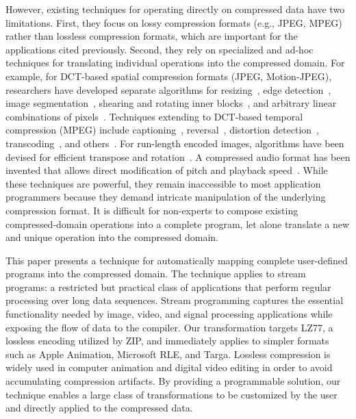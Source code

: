 However, existing techniques for operating directly on compressed data
have two limitations.  First, they focus on lossy compression formats
(e.g., JPEG, MPEG) rather than lossless compression formats, which are
important for the applications cited previously.  Second, they rely on
specialized and ad-hoc techniques for translating individual
operations into the compressed domain.  For example, for DCT-based
spatial compression formats (JPEG, Motion-JPEG), researchers have
developed separate algorithms for resizing~\cite{dugad01,mukherjee02},
edge detection~\cite{shen96b,shen96}, image
segmentation~\cite{feng03}, shearing and rotating inner
blocks~\cite{shen98}, and arbitrary linear combinations of
pixels~\cite{smith96b}.  Techniques extending to DCT-based temporal
compression (MPEG) include captioning~\cite{nang00},
reversal~\cite{vasudev98}, distortion detection~\cite{dorai00},
transcoding~\cite{smith98}, and others~\cite{wee02survey}.  For
run-length encoded images, algorithms have been devised for efficient
transpose and rotation~\cite{misra99,shoji95}.  A compressed audio
format has been invented that allows direct modification of pitch and
playback speed~\cite{levine98}.  While these techniques are powerful,
they remain inaccessible to most application programmers because they
demand intricate manipulation of the underlying compression format.
It is difficult for non-experts to compose existing compressed-domain
operations into a complete program, let alone translate a new and
unique operation into the compressed domain.

This paper presents a technique for automatically mapping complete
user-defined programs into the compressed domain.  The technique
applies to stream programs: a restricted but practical class of
applications that perform regular processing over long data sequences.
Stream programming captures the essential functionality needed by
image, video, and signal processing applications while exposing the
flow of data to the compiler.  Our transformation targets LZ77, a
lossless encoding utilized by ZIP, and immediately applies to simpler
formats such as Apple Animation, Microsoft RLE, and Targa.  Lossless
compression is widely used in computer animation and digital video
editing in order to avoid accumulating compression artifacts.  By
providing a programmable solution, our technique enables a large class
of transformations to be customized by the user and directly applied
to the compressed data.

